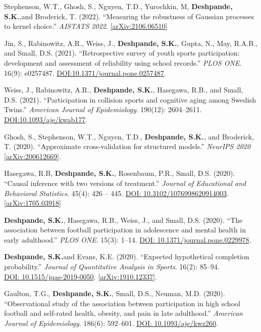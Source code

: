 \documentclass[margin]{res}
\def\skd{\textbf{Deshpande, S.K.}}
\begin{document}
\begin{resume}
Stephenson, W.T., Ghosh, S., Nguyen, T.D., Yurochkin, M, \skd,and Broderick, T. (2022). ``Measuring the robustness of Gaussian processes to kernel choice.'' \textit{AISTATS 2022}. \href{https://arxiv.org/abs/2106.06510}{[arXiv:2106.06510]}

Jin, S., Rabinowitz, A.R., Weiss, J., \skd, Gupta, N., May, R.A.B., and Small, D.S. (2021). ``Retrospective survey of youth sports participation: development and assessment of reliability using school records.'' \textit{PLOS ONE}. 16(9): e0257487. \href{https://doi.org/10.1371/journal.pone.0257487}{DOI:10.1371/journal.pone.0257487}.

Weiss, J., Rabinowitz, A.R., \skd, Hasegawa, R.B., and Small, D.S. (2021). ``Participation in collision sports and cognitive aging among Swedish Twins.'' \textit{American Journal of Epidemiology}. 190(12): 2604--2611. \href{https://doi.org/10.1093/aje/kwab177}{DOI:10.1093/aje/kwab177}.

Ghosh, S., Stephenson, W.T., Nguyen, T.D., \skd, and Broderick, T. (2020). ``Approximate cross-validation for structured models.'' \textit{NeurIPS 2020} \href{https://arxiv.org/abs/2006.12669}{[arXiv:200612669]}. 

Hasegawa, R.B, \skd, Rosenbaum, P.R., Small, D.S. (2020). ``Causal inference with two versions of treatment.'' \textit{Journal of Educational and Behavioral Statistics}. 45(4): 426 -- 445. \href{https://doi.org/10.3102/1076998620914003}{DOI: 10.3102/1076998620914003}. \href{https://arxiv.org/abs/1705.03918}{[arXiv:1705.03918]}

\skd, Hasegawa, R.B., Weiss, J., and Small, D.S. (2020). ``The association between football participation in adolescence and mental health in early adulthood.'' \textit{PLOS ONE}. 15(3): 1--14. \href{https://doi.org/10.1371/journal.pone.0229978}{DOI: 10.1371/journal.pone.0229978}.

\skd and Evans, K.E. (2020). ``Expected hypothetical completion probability.'' \textit{Journal of Quantitative Analysis in Sports}. 16(2): 85--94.\\ \href{https://doi.org/10.1515/jqas-2019-0050}{DOI: 10.1515/jqas-2019-0050}. \href{https://arxiv.org/abs/1910.12337}{[arXiv:1910.12337]}.

Gaulton, T.G., \skd, Small, D.S., Neuman, M.D. (2020). ``Observational study of the association between participation in high school football and self-rated health, obesity, and pain in late adulthood.'' \textit{American Journal of Epidemiology}. 186(6): 592--601. \href{https://doi.org/10.1093/aje/kwz260}{DOI: 10.1093/aje/kwz260}.


\end{resume}
\end{document}
